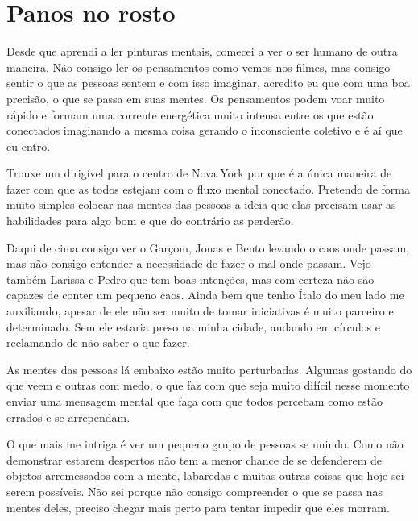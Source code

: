 
\chapter{Panos no rosto}



Desde que aprendi a ler pinturas mentais, comecei a ver o ser humano de outra maneira. Não consigo ler os pensamentos como vemos nos filmes, mas consigo sentir o que as pessoas sentem e com isso imaginar, acredito eu que com uma boa precisão, o que se passa em suas mentes. Os pensamentos podem voar muito rápido e formam uma corrente energética muito intensa entre os que estão conectados imaginando a mesma coisa gerando o inconsciente coletivo e é aí que eu entro.

Trouxe um dirigível para o centro de Nova York por que é a única maneira de fazer com que as todos estejam com o fluxo mental conectado. Pretendo de forma muito simples colocar nas mentes das pessoas a ideia que elas precisam usar as habilidades para algo bom e que do contrário as perderão.

Daqui de cima consigo ver o Garçom, Jonas e Bento levando o caos onde passam, mas não consigo entender a necessidade de fazer o mal onde passam. Vejo também Larissa e Pedro que tem boas intenções, mas com certeza não são capazes de conter um pequeno caos. Ainda bem que tenho Ítalo do meu lado me auxiliando, apesar de ele não ser muito de tomar iniciativas é muito parceiro e determinado. Sem ele estaria preso na minha cidade, andando em círculos e reclamando de não saber o que fazer.

As mentes das pessoas lá embaixo estão muito perturbadas. Algumas gostando do que veem e outras com medo, o que faz com que seja muito difícil nesse momento enviar uma mensagem mental que faça com que todos percebam como estão errados e se arrependam.

O que mais me intriga é ver um pequeno grupo de pessoas se unindo. Como não demonstrar estarem despertos não tem a menor chance de se defenderem de objetos arremessados com a mente, labaredas e muitas outras coisas que hoje sei serem possíveis. Não sei porque não consigo compreender o que se passa nas mentes deles, preciso chegar mais perto para tentar impedir que eles morram.

